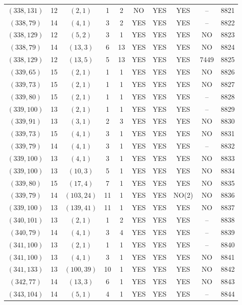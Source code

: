 \begin{longtable}{|c|c|c|c|c|c|c|c|c|c|}
$(338, 131)$ & 12 & $(2, 1)$ & 1 & 2 & NO & YES & YES & -- & 8821\\
$(338, 79)$ & 14 & $(4, 1)$ & 3 & 2 & YES & YES & YES & -- & 8822\\
$(338, 129)$ & 12 & $(5, 2)$ & 3 & 1 & YES & YES & YES & NO & 8823\\
$(338, 79)$ & 14 & $(13, 3)$ & 6 & 13 & YES & YES & YES & NO & 8824\\
$(338, 129)$ & 12 & $(13, 5)$ & 5 & 13 & YES & YES & YES & 7449 & 8825\\
$(339, 65)$ & 15 & $(2, 1)$ & 1 & 1 & YES & YES & YES & NO & 8826\\
$(339, 73)$ & 15 & $(2, 1)$ & 1 & 1 & YES & YES & YES & NO & 8827\\
$(339, 80)$ & 15 & $(2, 1)$ & 1 & 1 & YES & YES & YES & -- & 8828\\
$(339, 100)$ & 13 & $(2, 1)$ & 1 & 1 & YES & YES & YES & -- & 8829\\
$(339, 91)$ & 13 & $(3, 1)$ & 2 & 3 & YES & YES & YES & NO & 8830\\
$(339, 73)$ & 15 & $(4, 1)$ & 3 & 1 & YES & YES & YES & NO & 8831\\
$(339, 79)$ & 14 & $(4, 1)$ & 3 & 1 & YES & YES & YES & -- & 8832\\
$(339, 100)$ & 13 & $(4, 1)$ & 3 & 1 & YES & YES & YES & NO & 8833\\
$(339, 100)$ & 13 & $(10, 3)$ & 5 & 1 & YES & YES & YES & NO & 8834\\
$(339, 80)$ & 15 & $(17, 4)$ & 7 & 1 & YES & YES & YES & NO & 8835\\
$(339, 79)$ & 14 & $(103, 24)$ & 11 & 1 & YES & YES & NO(2) & NO & 8836\\
$(339, 100)$ & 13 & $(139, 41)$ & 11 & 1 & YES & YES & YES & NO & 8837\\
$(340, 101)$ & 13 & $(2, 1)$ & 1 & 2 & YES & YES & YES & -- & 8838\\
$(340, 79)$ & 14 & $(4, 1)$ & 3 & 4 & YES & YES & YES & -- & 8839\\
$(341, 100)$ & 13 & $(2, 1)$ & 1 & 1 & YES & YES & YES & -- & 8840\\
$(341, 100)$ & 13 & $(4, 1)$ & 3 & 1 & YES & YES & YES & NO & 8841\\
$(341, 133)$ & 13 & $(100, 39)$ & 10 & 1 & YES & YES & YES & NO & 8842\\
$(342, 77)$ & 14 & $(13, 3)$ & 6 & 1 & YES & YES & YES & NO & 8843\\
$(343, 104)$ & 14 & $(5, 1)$ & 4 & 1 & YES & YES & YES & -- & 8844\\

\end{longtable}
